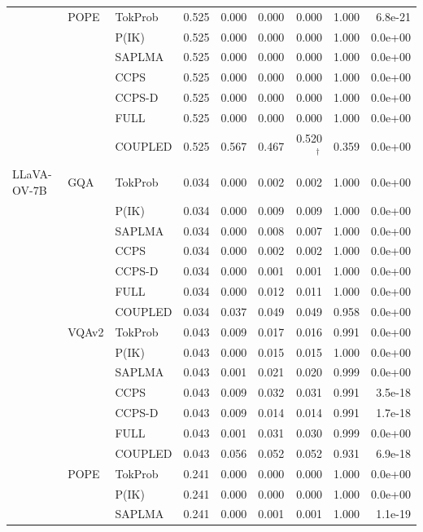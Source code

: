 \begin{longtable}{
>{\small}l
>{\small}l
>{\small}l
>{\small}r
>{\small}r
>{\small}r
>{\small}r
>{\small}r
>{\small}r
}
\addlinespace
 & POPE & TokProb & 0.525 & 0.000 & 0.000 & 0.000 & 1.000 & 6.8e-21 \\
 &  & P(IK) & 0.525 & 0.000 & 0.000 & 0.000 & 1.000 & 0.0e+00 \\
 &  & SAPLMA & 0.525 & 0.000 & 0.000 & 0.000 & 1.000 & 0.0e+00 \\
 &  & CCPS & 0.525 & 0.000 & 0.000 & 0.000 & 1.000 & 0.0e+00 \\
 &  & CCPS-D & 0.525 & 0.000 & 0.000 & 0.000 & 1.000 & 0.0e+00 \\
 &  & FULL & 0.525 & 0.000 & 0.000 & 0.000 & 1.000 & 0.0e+00 \\
 &  & COUPLED & 0.525 & 0.567 & 0.467 & 0.520$^{\dagger}$\, & 0.359 & 0.0e+00 \\
\midrule
LLaVA-OV-7B & GQA & TokProb & 0.034 & 0.000 & 0.002 & 0.002 & 1.000 & 0.0e+00 \\
 &  & P(IK) & 0.034 & 0.000 & 0.009 & 0.009 & 1.000 & 0.0e+00 \\
 &  & SAPLMA & 0.034 & 0.000 & 0.008 & 0.007 & 1.000 & 0.0e+00 \\
 &  & CCPS & 0.034 & 0.000 & 0.002 & 0.002 & 1.000 & 0.0e+00 \\
 &  & CCPS-D & 0.034 & 0.000 & 0.001 & 0.001 & 1.000 & 0.0e+00 \\
 &  & FULL & 0.034 & 0.000 & 0.012 & 0.011 & 1.000 & 0.0e+00 \\
 &  & COUPLED & 0.034 & 0.037 & 0.049 & 0.049 & 0.958 & 0.0e+00 \\
\addlinespace
 & VQAv2 & TokProb & 0.043 & 0.009 & 0.017 & 0.016 & 0.991 & 0.0e+00 \\
 &  & P(IK) & 0.043 & 0.000 & 0.015 & 0.015 & 1.000 & 0.0e+00 \\
 &  & SAPLMA & 0.043 & 0.001 & 0.021 & 0.020 & 0.999 & 0.0e+00 \\
 &  & CCPS & 0.043 & 0.009 & 0.032 & 0.031 & 0.991 & 3.5e-18 \\
 &  & CCPS-D & 0.043 & 0.009 & 0.014 & 0.014 & 0.991 & 1.7e-18 \\
 &  & FULL & 0.043 & 0.001 & 0.031 & 0.030 & 0.999 & 0.0e+00 \\
 &  & COUPLED & 0.043 & 0.056 & 0.052 & 0.052 & 0.931 & 6.9e-18 \\
\addlinespace
 & POPE & TokProb & 0.241 & 0.000 & 0.000 & 0.000 & 1.000 & 0.0e+00 \\
 &  & P(IK) & 0.241 & 0.000 & 0.000 & 0.000 & 1.000 & 0.0e+00 \\
 &  & SAPLMA & 0.241 & 0.000 & 0.001 & 0.001 & 1.000 & 1.1e-19 \\

\end{longtable}
